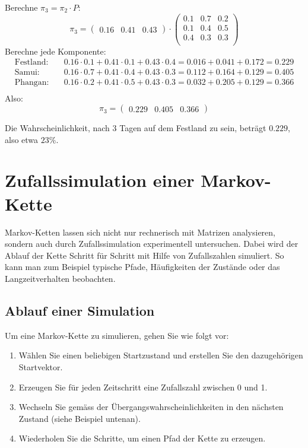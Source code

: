 \begin{mychallenge}
\begin{myanswer}
        Berechne $\pi_3 = \pi_2 \cdot P$:
        \[
            \pi_3 = \begin{pmatrix} 0.16 & 0.41 & 0.43 \end{pmatrix}
            \cdot
            \begin{pmatrix}
                0.1 & 0.7 & 0.2 \\
                0.1 & 0.4 & 0.5 \\
                0.4 & 0.3 & 0.3 \\
            \end{pmatrix}
        \]
        Berechne jede Komponente:
        \begin{align*}
            \text{Festland:} & \quad 0.16 \cdot 0.1 + 0.41 \cdot 0.1 + 0.43 \cdot 0.4 = 0.016 + 0.041 + 0.172 = 0.229 \\
            \text{Samui:}    & \quad 0.16 \cdot 0.7 + 0.41 \cdot 0.4 + 0.43 \cdot 0.3 = 0.112 + 0.164 + 0.129 = 0.405 \\
            \text{Phangan:}  & \quad 0.16 \cdot 0.2 + 0.41 \cdot 0.5 + 0.43 \cdot 0.3 = 0.032 + 0.205 + 0.129 = 0.366 \\
        \end{align*}
        Also:
        \[
            \pi_3 = \begin{pmatrix} 0.229 & 0.405 & 0.366 \end{pmatrix}
        \]

        Die Wahrscheinlichkeit, nach 3 Tagen auf dem Festland zu sein, beträgt $0.229$, also etwa $23\%$.
    \end{myanswer}
\end{mychallenge}


\section{Zufallssimulation einer Markov-Kette}

Markov-Ketten lassen sich nicht nur rechnerisch mit Matrizen analysieren, sondern auch durch Zufallssimulation experimentell untersuchen. Dabei wird der Ablauf der Kette Schritt für Schritt mit Hilfe von Zufallszahlen simuliert. So kann man zum Beispiel typische Pfade, Häufigkeiten der Zustände oder das Langzeitverhalten beobachten.

\subsection{Ablauf einer Simulation}

Um eine Markov-Kette zu simulieren, gehen Sie wie folgt vor:
\begin{enumerate}
    \item Wählen Sie einen beliebigen Startzustand und erstellen Sie den dazugehörigen Startvektor.
    \item Erzeugen Sie für jeden Zeitschritt eine Zufallszahl zwischen 0 und 1.
    \item Wechseln Sie gemäss der Übergangswahrscheinlichkeiten in den nächsten Zustand (siehe Beispiel untenan).
    \item Wiederholen Sie die Schritte, um einen Pfad der Kette zu erzeugen.
\end{enumerate}

